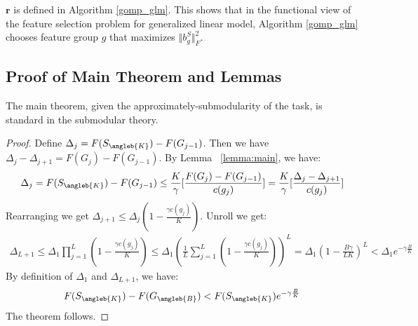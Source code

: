 $\textbf{r}$ is defined in Algorithm \ref{gomp_glm}. This shows that in the functional view of the 
feature selection problem for generalized linear model, Algorithm \ref{gomp_glm} chooses
feature group $g$ that maximizes $\Vert b_{g}^S \Vert _F^2$.



\subsection{Proof of Main Theorem and Lemmas}
The main theorem, given the approximately-submodularity of the task, is standard in the 
submodular theory. 
\begin{proof}
  Define $\Delta _j = F(S_{\angleb{K}}) - F(G_{j-1})$. Then we have 
  $\Delta _j - \Delta_{j+1} = F(G_{j}) - F(G_{j-1})$. By Lemma ~\ref{lemma:main}, we have:
  \begin{align*}
    \Delta_j = F(S_{\angleb{K}}) - F(G_{j-1}) \leq \frac{K}{\gamma}
      \lbrack \frac{F(G_{j}) - F(G_{j-1})}{c(g_{j})} \rbrack 
        = \frac{K}{\gamma} \lbrack \frac{\Delta_j - \Delta_{j+1}}{c(g_j)} \rbrack
  \end{align*}
  Rearranging we get 
    $\Delta_{j+1} \leq \Delta_j ( 1 - \frac{\gamma c(g_j)}{K} )$. Unroll we get:
  \begin{align*}
    \Delta _{L+1} 
    \leq 
      \Delta _1 \prod _{j=1}^L (1 - \frac{\gamma c(g_j)}{K})
    \leq \Delta _1 ( \frac{1}{L} \sum _{j=1}^L (1- \frac{\gamma c(g_j)}{K})) ^L
    = \Delta _1 (1 - \frac{B\gamma}{L K})^L < \Delta_1 e^{- \gamma \frac{B}{K}}
  \end{align*}
  By definition of $\Delta_1$ and $\Delta_{L+1}$, we have:
  \begin{align*}
    F(S_{\angleb{K}}) - F(G_{\angleb{B}}) < F(S_{\angleb{K}}) e^{- \gamma \frac{B}{K}}
  \end{align*}
  The theorem follows.
\end{proof}

